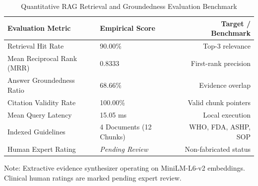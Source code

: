 \begin{table}[htbp]
\centering
\caption{Quantitative RAG Retrieval and Groundedness Evaluation Benchmark}
\label{tab:rag_evaluation}
\begin{tabular}{llr}
\toprule
\textbf{Evaluation Metric} & \textbf{Empirical Score} & \textbf{Target / Benchmark} \\
\midrule
Retrieval Hit Rate & 90.00\% & Top-3 relevance \\
Mean Reciprocal Rank (MRR) & 0.8333 & First-rank precision \\
Answer Groundedness Ratio & 68.66\% & Evidence overlap \\
Citation Validity Rate & 100.00\% & Valid chunk pointers \\
Mean Query Latency & 15.05 ms & Local execution \\
Indexed Guidelines & 4 Documents (12 Chunks) & WHO, FDA, ASHP, SOP \\
Human Expert Rating & \textit{Pending Review} & Non-fabricated status \\
\bottomrule
\end{tabular}
\begin{flushleft}
\small Note: Extractive evidence synthesizer operating on MiniLM-L6-v2 embeddings. Clinical human ratings are marked pending expert review.
\end{flushleft}
\end{table}
